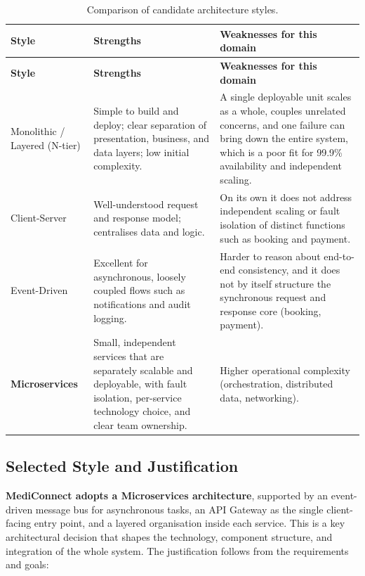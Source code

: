 \documentclass[12pt,a4paper]{article}
\begin{document}
\begin{longtable}{p{2.7cm} p{5.0cm} p{5.4cm}}
\caption{Comparison of candidate architecture styles.}\\
\toprule
\textbf{Style} & \textbf{Strengths} & \textbf{Weaknesses for this domain}\\
\midrule
\endfirsthead
\toprule
\textbf{Style} & \textbf{Strengths} & \textbf{Weaknesses for this domain}\\
\midrule
\endhead
Monolithic / Layered (N-tier) & Simple to build and deploy; clear separation of
presentation, business, and data layers; low initial complexity. & A single deployable unit
scales as a whole, couples unrelated concerns, and one failure can bring down the entire
system, which is a poor fit for 99.9\% availability and independent scaling.\\
Client-Server & Well-understood request and response model; centralises data and logic. &
On its own it does not address independent scaling or fault isolation of distinct functions
such as booking and payment.\\
Event-Driven & Excellent for asynchronous, loosely coupled flows such as notifications and
audit logging. & Harder to reason about end-to-end consistency, and it does not by itself
structure the synchronous request and response core (booking, payment).\\
\textbf{Microservices} & Small, independent services that are separately scalable and
deployable, with fault isolation, per-service technology choice, and clear team ownership. &
Higher operational complexity (orchestration, distributed data, networking).\\
\bottomrule
\end{longtable}

\subsection{Selected Style and Justification}
\textbf{MediConnect adopts a Microservices architecture}, supported by an event-driven message
bus for asynchronous tasks, an API Gateway as the single client-facing entry point, and a
layered organisation inside each service. This is a key architectural decision that shapes the
technology, component structure, and integration of the whole system. The justification
follows from the requirements and goals:
\end{document}
